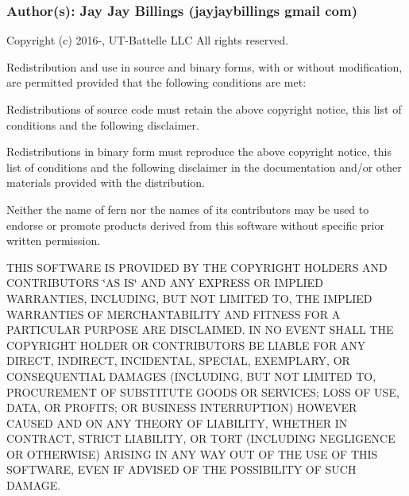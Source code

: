 \subsubsection*{Author(s)\+: Jay Jay Billings (jayjaybillings  gmail  com) }



 Copyright (c) 2016-\/, U\+T-\/\+Battelle L\+L\+C All rights reserved.

Redistribution and use in source and binary forms, with or without modification, are permitted provided that the following conditions are met\+:

Redistributions of source code must retain the above copyright notice, this list of conditions and the following disclaimer.

Redistributions in binary form must reproduce the above copyright notice, this list of conditions and the following disclaimer in the documentation and/or other materials provided with the distribution.

Neither the name of fern nor the names of its contributors may be used to endorse or promote products derived from this software without specific prior written permission.

T\+H\+I\+S S\+O\+F\+T\+W\+A\+R\+E I\+S P\+R\+O\+V\+I\+D\+E\+D B\+Y T\+H\+E C\+O\+P\+Y\+R\+I\+G\+H\+T H\+O\+L\+D\+E\+R\+S A\+N\+D C\+O\+N\+T\+R\+I\+B\+U\+T\+O\+R\+S \char`\"{}\+A\+S I\+S\char`\"{} A\+N\+D A\+N\+Y E\+X\+P\+R\+E\+S\+S O\+R I\+M\+P\+L\+I\+E\+D W\+A\+R\+R\+A\+N\+T\+I\+E\+S, I\+N\+C\+L\+U\+D\+I\+N\+G, B\+U\+T N\+O\+T L\+I\+M\+I\+T\+E\+D T\+O, T\+H\+E I\+M\+P\+L\+I\+E\+D W\+A\+R\+R\+A\+N\+T\+I\+E\+S O\+F M\+E\+R\+C\+H\+A\+N\+T\+A\+B\+I\+L\+I\+T\+Y A\+N\+D F\+I\+T\+N\+E\+S\+S F\+O\+R A P\+A\+R\+T\+I\+C\+U\+L\+A\+R P\+U\+R\+P\+O\+S\+E A\+R\+E D\+I\+S\+C\+L\+A\+I\+M\+E\+D. I\+N N\+O E\+V\+E\+N\+T S\+H\+A\+L\+L T\+H\+E C\+O\+P\+Y\+R\+I\+G\+H\+T H\+O\+L\+D\+E\+R O\+R C\+O\+N\+T\+R\+I\+B\+U\+T\+O\+R\+S B\+E L\+I\+A\+B\+L\+E F\+O\+R A\+N\+Y D\+I\+R\+E\+C\+T, I\+N\+D\+I\+R\+E\+C\+T, I\+N\+C\+I\+D\+E\+N\+T\+A\+L, S\+P\+E\+C\+I\+A\+L, E\+X\+E\+M\+P\+L\+A\+R\+Y, O\+R C\+O\+N\+S\+E\+Q\+U\+E\+N\+T\+I\+A\+L D\+A\+M\+A\+G\+E\+S (I\+N\+C\+L\+U\+D\+I\+N\+G, B\+U\+T N\+O\+T L\+I\+M\+I\+T\+E\+D T\+O, P\+R\+O\+C\+U\+R\+E\+M\+E\+N\+T O\+F S\+U\+B\+S\+T\+I\+T\+U\+T\+E G\+O\+O\+D\+S O\+R S\+E\+R\+V\+I\+C\+E\+S; L\+O\+S\+S O\+F U\+S\+E, D\+A\+T\+A, O\+R P\+R\+O\+F\+I\+T\+S; O\+R B\+U\+S\+I\+N\+E\+S\+S I\+N\+T\+E\+R\+R\+U\+P\+T\+I\+O\+N) H\+O\+W\+E\+V\+E\+R C\+A\+U\+S\+E\+D A\+N\+D O\+N A\+N\+Y T\+H\+E\+O\+R\+Y O\+F L\+I\+A\+B\+I\+L\+I\+T\+Y, W\+H\+E\+T\+H\+E\+R I\+N C\+O\+N\+T\+R\+A\+C\+T, S\+T\+R\+I\+C\+T L\+I\+A\+B\+I\+L\+I\+T\+Y, O\+R T\+O\+R\+T (I\+N\+C\+L\+U\+D\+I\+N\+G N\+E\+G\+L\+I\+G\+E\+N\+C\+E O\+R O\+T\+H\+E\+R\+W\+I\+S\+E) A\+R\+I\+S\+I\+N\+G I\+N A\+N\+Y W\+A\+Y O\+U\+T O\+F T\+H\+E U\+S\+E O\+F T\+H\+I\+S S\+O\+F\+T\+W\+A\+R\+E, E\+V\+E\+N I\+F A\+D\+V\+I\+S\+E\+D O\+F T\+H\+E P\+O\+S\+S\+I\+B\+I\+L\+I\+T\+Y O\+F S\+U\+C\+H D\+A\+M\+A\+G\+E.

